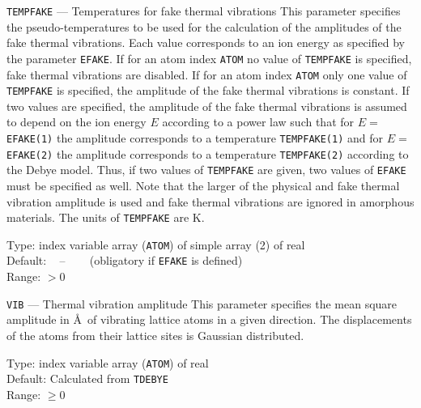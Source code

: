 \begin{keydescription}{\texttt{TEMPFAKE} --- Temperatures for fake thermal vibrations}
%
  This parameter specifies the pseudo-temperatures to be used for the 
  calculation of the amplitudes of the fake thermal vibrations. Each value 
  corresponds to an ion energy as specified by the parameter \texttt{EFAKE}.
  If for an atom index \texttt{ATOM} no value of \texttt{TEMPFAKE} is 
  specified, fake thermal vibrations are disabled. If for an atom index 
  \texttt{ATOM} only one value of \texttt{TEMPFAKE} is specified, the 
  amplitude of the fake thermal vibrations is constant. If two values are
  specified, the amplitude of the fake thermal vibrations is assumed to
  depend on the ion energy $E$ according to a power law such that for 
  $E=$\texttt{EFAKE(1)} the amplitude corresponds to a temperature 
  \texttt{TEMPFAKE(1)} and for $E=$\texttt{EFAKE(2)} the amplitude 
  corresponds to a temperature \texttt{TEMPFAKE(2)} according to the
  Debye model. Thus, if two values of \texttt{TEMPFAKE} are given,
  two values of \texttt{EFAKE} must be specified as well. Note that the
  larger of the physical and fake thermal vibration amplitude is used and
  fake thermal vibrations are ignored in amorphous materials. The units of 
  \texttt{TEMPFAKE} are K.
  \begin{keytab}
    Type:    \> index variable array (\texttt{ATOM}) of simple array (2) of real \\
    Default: \> ~ -- ~~~ (obligatory if \texttt{EFAKE} is defined) \\
    Range:   \> $> 0$
  \end{keytab}
\end{keydescription}

\begin{keydescription}{\texttt{VIB} --- Thermal vibration amplitude}
%
  This parameter specifies the mean square amplitude in \AA\ of
  vibrating lattice atoms in a given direction. The displacements of
  the atoms from their lattice sites is Gaussian distributed.
%
  \begin{keytab}
    Type:    \> index variable array (\texttt{ATOM}) of real \\
    Default: \> Calculated from \texttt{TDEBYE} \\
    Range:   \> $\ge 0$
  \end{keytab}
\end{keydescription}
